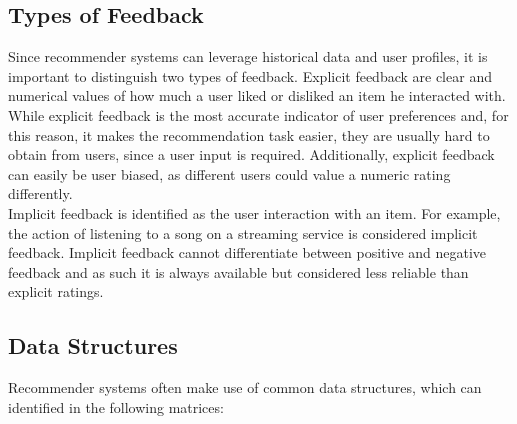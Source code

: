 \subsection{Types of Feedback}

Since recommender systems can leverage historical data and user profiles, it is important to distinguish two types of feedback.
Explicit feedback are clear and numerical values of how much a user liked or disliked an item he interacted with.
While explicit feedback is the most accurate indicator of user preferences and, for this reason, it makes the recommendation task easier, they are usually hard to obtain from users, since a user input is required. Additionally, explicit feedback can easily be user biased, as different users could value a numeric rating differently.\\
Implicit feedback is identified as the user interaction with an item. For example, the action of listening to a song on a streaming service is considered implicit feedback.
Implicit feedback cannot differentiate between positive and negative feedback and as such it is always available but considered less reliable than explicit ratings.


\subsection{Data Structures}

Recommender systems often make use of common data structures, which can identified in the following matrices:


